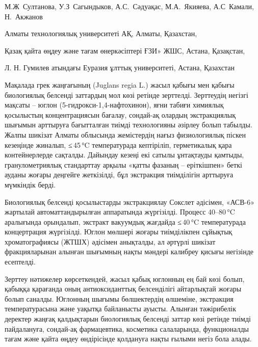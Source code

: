 
\begin{header}

М.Ж~Султанова,
У.З~Сагындыков,
А.С.~Сәдуақас,
М.А.~Якияева,
А.С~Камали,
Н.~Акжанов\envelope
\end{header}

\begin{affil}
Алматы технологиялық университеті АҚ, Алматы, Қазахстан,

Қазақ қайта өңдеу және тағам өнеркәсіптері ҒЗИ» ЖШС, Астана, Қазақстан,

Л. Н. Гумилев атындағы Еуразия ұлттық университеті, Астана, Қазахстан

\end{affil}

Мақалада грек жаңғағының (Juglans regia L.) жасыл қабығы мен қабығы
биологиялық белсенді заттардың мол көзі ретінде зерттелді. Зерттеудің
негізгі мақсаты -- юглон (5-гидрокси-1,4-нафто\-хинон), яғни табиғи
химиялық қосылыстың концентрациясын бағалау, сондай-ақ олардың
экстракциялық шығымын арттыруға бағытталған тиімді технологияны әзірлеу
болып табылды. Жалпы шикізат Алматы облысында жемістердің нағыз
физиологиялық піскен кезеңінде жиналып, ≤\,45\,°C температурада
кептіріліп, герметикалық қара контейнерлерде сақталды. Дайындау кезеңі
екі сатылы ұнтақтауды қамтыды, гранулометриялық стандарттау арқылы
«қатты фазаның -- еріткішпен» беткі ауданы жоғары деңгейге жеткізілді,
бұл экстракция тиімділігін арттыруға мүмкіндік берді.

Биологиялық белсенді қосылыстарды экстракциялау Сокслет әдісімен,
«АСВ-6» жартылай автоматтандырылған аппаратында жүргізілді. Процесс
40--80\,°C аралығында орындалып, экстракт вакуумдық жағдайда ≤\,40\,°C
температурада концертрация жүргізілді. Юглон мөлшері жоғары тиімділікпен
сұйықтық хроматографиясы (ЖТШХ) әдісімен анықталды, ал әртүрлі шикізат
фракцияларынан алынған шығымның нақты мәндері калибреу қисығы негізінде
есептелді.

Зерттеу нәтижелер көрсеткендей, жасыл қабық юглонның ең бай көзі болып,
қабыққа қарағанда оның антиоксиданттық белсенділігі айтарлықтай жоғары
болып саналды. Юглонның шығымы бөлшектердің өлшеміне, экстракция
температурасына және уақытқа байланысты ауысты. Алынған тәжірибелік
деректер жаңғақ қалдықтарын биологиялық белсенді заттар көзі ретінде
тиімді пайдалануға, сондай-ақ фармацевтика, косметика салаларында,
функционалды тағам және қайта өңдеу өндірісінде қолдануға нақты ғылыми
негіз бола алады.

